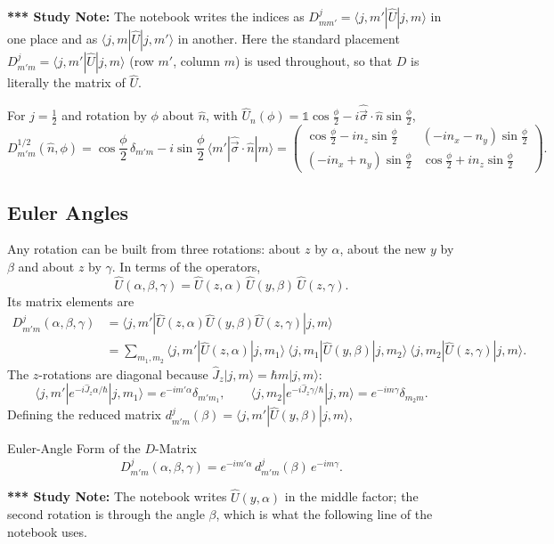 \documentclass[11pt,a4paper]{article}
\begin{document}
\textbf{*** Study Note:} The notebook writes the indices as $D^j_{mm'}=\langle j,m'|\hat U|j,m\rangle$ in one place and as $\langle j,m|\hat U|j,m'\rangle$ in another. Here the standard placement $D^j_{m'm}=\langle j,m'|\hat U|j,m\rangle$ (row $m'$, column $m$) is used throughout, so that $D$ is literally the matrix of $\hat U$.

For $j=\tfrac12$ and rotation by $\phi$ about $\hat n$, with $\hat U_{\hat n}(\phi)=\mathbb 1\cos\frac\phi2-i\hat{\vec\sigma}\cdot\hat n\sin\frac\phi2$,
\[
D^{1/2}_{m'm}(\hat n,\phi)=\cos\frac\phi2\,\delta_{m'm}-i\sin\frac\phi2\,\langle m'|\hat{\vec\sigma}\cdot\hat n|m\rangle=
\begin{pmatrix}\cos\frac\phi2-in_z\sin\frac\phi2&(-in_x-n_y)\sin\frac\phi2\\(-in_x+n_y)\sin\frac\phi2&\cos\frac\phi2+in_z\sin\frac\phi2\end{pmatrix}.
\]

\subsection{Euler Angles}
Any rotation can be built from three rotations: about $z$ by $\alpha$, about the new $y$ by $\beta$ and about $z$ by $\gamma$. In terms of the operators,
\[
\hat U(\alpha,\beta,\gamma)=\hat U(z,\alpha)\,\hat U(y,\beta)\,\hat U(z,\gamma).
\]
Its matrix elements are
\begin{align*}
D^j_{m'm}(\alpha,\beta,\gamma)&=\langle j,m'|\hat U(z,\alpha)\hat U(y,\beta)\hat U(z,\gamma)|j,m\rangle\\
&=\sum_{m_1,m_2}\langle j,m'|\hat U(z,\alpha)|j,m_1\rangle\ \langle j,m_1|\hat U(y,\beta)|j,m_2\rangle\ \langle j,m_2|\hat U(z,\gamma)|j,m\rangle .
\end{align*}
The $z$-rotations are diagonal because $\hat J_z|j,m\rangle=\hbar m|j,m\rangle$:
\[
\langle j,m'|e^{-i\hat J_z\alpha/\hbar}|j,m_1\rangle=e^{-im'\alpha}\delta_{m'm_1},\qquad
\langle j,m_2|e^{-i\hat J_z\gamma/\hbar}|j,m\rangle=e^{-im\gamma}\delta_{m_2m}.
\]
Defining the reduced matrix $d^j_{m'm}(\beta)=\langle j,m'|\hat U(y,\beta)|j,m\rangle$,

\begin{thm}{Euler-Angle Form of the $D$-Matrix}
\[
D^j_{m'm}(\alpha,\beta,\gamma)=e^{-im'\alpha}\,d^j_{m'm}(\beta)\,e^{-im\gamma}.
\]
\end{thm}

\textbf{*** Study Note:} The notebook writes $\hat U(y,\alpha)$ in the middle factor; the second rotation is through the angle $\beta$, which is what the following line of the notebook uses.
\end{document}

